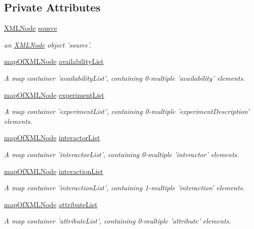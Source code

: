 \subsection*{Private Attributes}
\begin{DoxyCompactItemize}
\item 
\hyperlink{structXMLNode}{X\-M\-L\-Node} \hyperlink{classunisys_1_1PSIMI_a69f3464b518bc0c67ece6a4976d521b6}{source}
\begin{DoxyCompactList}\small\item\em an \hyperlink{structXMLNode}{X\-M\-L\-Node} object 'source'. \end{DoxyCompactList}\item 
\hyperlink{classunisys_1_1PSIMI_a0cc51198d3cd685cfa21a42c5dc0ee7f}{map\-Of\-X\-M\-L\-Node} \hyperlink{classunisys_1_1PSIMI_a6101dbe254c85337509cdc0dc3870c6f}{availability\-List}
\begin{DoxyCompactList}\small\item\em A map container 'availability\-List', containing 0-\/multiple 'availability' elements. \end{DoxyCompactList}\item 
\hyperlink{classunisys_1_1PSIMI_a0cc51198d3cd685cfa21a42c5dc0ee7f}{map\-Of\-X\-M\-L\-Node} \hyperlink{classunisys_1_1PSIMI_a8cf7de1d5c6972fb0145cf4836eb9fac}{experiment\-List}
\begin{DoxyCompactList}\small\item\em A map container 'experiment\-List', containing 0-\/multiple 'experiment\-Description' elements. \end{DoxyCompactList}\item 
\hyperlink{classunisys_1_1PSIMI_a0cc51198d3cd685cfa21a42c5dc0ee7f}{map\-Of\-X\-M\-L\-Node} \hyperlink{classunisys_1_1PSIMI_a5e4a20340555d16d2166fc93a15d0769}{interactor\-List}
\begin{DoxyCompactList}\small\item\em A map container 'interactor\-List', containing 0-\/multiple 'interactor' elements. \end{DoxyCompactList}\item 
\hyperlink{classunisys_1_1PSIMI_a0cc51198d3cd685cfa21a42c5dc0ee7f}{map\-Of\-X\-M\-L\-Node} \hyperlink{classunisys_1_1PSIMI_ad294c997b1b45b4cfbcc01d10b029142}{interaction\-List}
\begin{DoxyCompactList}\small\item\em A map container 'interaction\-List', containing 1-\/multiple 'interaction' elements. \end{DoxyCompactList}\item 
\hyperlink{classunisys_1_1PSIMI_a0cc51198d3cd685cfa21a42c5dc0ee7f}{map\-Of\-X\-M\-L\-Node} \hyperlink{classunisys_1_1PSIMI_ad38582c2fa15a80ce9d04404b2097608}{attribute\-List}
\begin{DoxyCompactList}\small\item\em A map container 'attribute\-List', containing 0-\/multiple 'attribute' elements. \end{DoxyCompactList}\end{DoxyCompactItemize}


